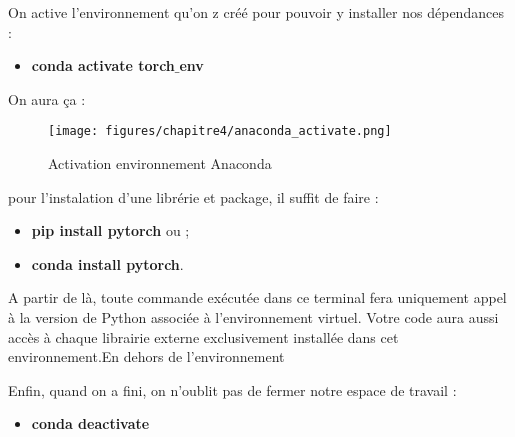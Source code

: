         \par On active l'environnement qu'on z créé pour pouvoir y installer nos dépendances :
        \begin{itemize}[label=|]
        \setlength{\itemsep}{5pt}
            \item \textbf{\large{conda activate torch$\_$env}}\\
        \end{itemize}
        \par On aura ça :
        
        \begin{figure}[H]
        	\begin{center}
        		\texttt{[image: figures/chapitre4/anaconda\_activate.png]}
        	\end{center}
        	\caption {Activation environnement Anaconda}
        	\label{fig:activenvconda}
        \end{figure}  
        
        \par pour l'instalation d'une librérie et package, il suffit de faire : 
        \begin{itemize}[label=|]
        \setlength{\itemsep}{5pt}
            \item \textbf{\large{pip install pytorch}} ou ;
            \item \textbf{\large{conda install pytorch}}.\\
        \end{itemize}
        
        \par A partir de là, toute commande exécutée dans ce terminal fera uniquement appel à la version de Python associée à l’environnement virtuel. Votre code aura aussi accès à chaque librairie externe exclusivement installée dans cet environnement.En dehors de l’environnement 
        \par Enfin, quand on a fini, on n'oublit pas de fermer notre espace de travail :
        \begin{itemize}[label=|]
        \setlength{\itemsep}{5pt}
            \item \textbf{\large{conda deactivate}}
        \end{itemize}
        
